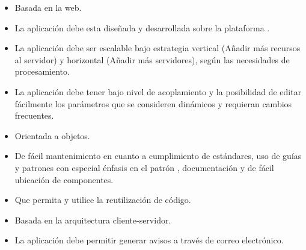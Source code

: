 \begin{itemize}
\item Basada en la web.
\item La aplicación debe esta diseñada y desarrollada sobre la
  plataforma .
\item La aplicación debe ser escalable bajo estrategia vertical (Añadir
  más recursos al servidor) y horizontal (Añadir más servidores),
  según las necesidades de procesamiento.
\item La aplicación debe tener bajo nivel de acoplamiento y la
  posibilidad de editar fácilmente los parámetros que se consideren
  dinámicos y requieran cambios frecuentes.
\item Orientada a objetos.
\item De fácil mantenimiento en cuanto a cumplimiento de estándares,
  uso de guías y patrones con especial énfasis en el patrón
  , documentación y de fácil ubicación de componentes.
\item Que permita y utilice la reutilización de código.
\item Basada en la arquitectura cliente-servidor.
\item La aplicación debe permitir generar avisos a través de correo
  electrónico.
\end{itemize}

